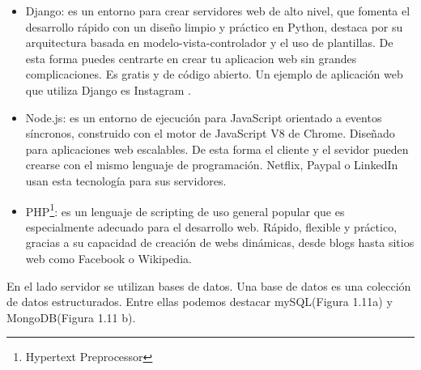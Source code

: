 \begin{itemize}
    \item Django: es un entorno para crear servidores web de alto nivel, que fomenta el desarrollo rápido con un diseño limpio y práctico en Python, destaca por su arquitectura basada en  modelo-vista-controlador y el uso de plantillas. De esta forma puedes centrarte en crear tu aplicacion web sin grandes complicaciones. Es gratis y de código abierto\cite{django}. Un ejemplo de aplicación web que utiliza Django es Instagram \cite{insta}.
    \item Node.js: es un entorno de ejecución para JavaScript orientado a eventos síncronos, construido con el motor de JavaScript V8 de Chrome. Diseñado para aplicaciones web escalables. De esta forma el cliente y el sevidor pueden crearse con el mismo lenguaje de programación\cite{node}. Netflix, Paypal o LinkedIn usan esta tecnología para sus servidores\cite{nodenetflix}. 
    
    \item PHP\footnote{Hypertext Preprocessor}: es un lenguaje de scripting de uso general popular que es especialmente adecuado para el desarrollo web\cite{php1}. Rápido, flexible y práctico, gracias a su capacidad de creación de webs dinámicas, desde blogs hasta sitios web como Facebook o Wikipedia\cite{php2}.
    
\end{itemize}

En el lado servidor se utilizan bases de datos. Una base de datos es una colección de datos estructurados. Entre ellas podemos destacar mySQL(Figura 1.11a) y MongoDB(Figura 1.11 b). 

